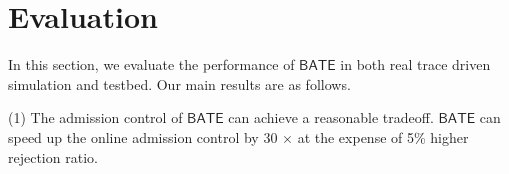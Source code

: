 \documentclass[sigconf]{acmart}
\begin{document}



%  
%

\section{Evaluation} \label{evaluation}
In this section, we evaluate the performance of $\mathsf{BATE}$  in both real trace driven simulation and testbed.
Our main results are as follows.

(1)  The admission control of $\mathsf{BATE}$ can achieve a reasonable tradeoff. $\mathsf{BATE}$ can speed up the online admission control by 30 $\times$ at the expense of 5\% higher rejection ratio. 
\end{document}
